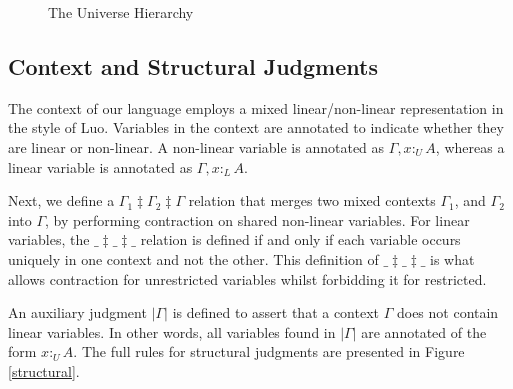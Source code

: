 \documentclass{article}
\theoremstyle{definition}
\newcommand{\pure}[1]{|#1|}
\newcommand{\utype}{:_{\scriptscriptstyle U}}
\newcommand{\ltype}{:_{\scriptscriptstyle L}}
\newcommand{\mrg}[3]{#1\ddagger#2\ddagger#3}
\begin{document}
  \begin{figure}[H]
    \caption{The Universe Hierarchy}
    \centering
    \label{universe}
  \end{figure}

  \subsection{Context and Structural Judgments}
  The context of our language employs a mixed linear/non-linear representation in the style of Luo\cite{luo}. Variables in the context are annotated to indicate whether they are linear or non-linear. A non-linear variable is annotated as $\Gamma, x \utype A$, whereas a linear variable is annotated as $\Gamma, x \ltype A$. 
  
  Next, we define a $\mrg{\Gamma_1}{\Gamma_2}{\Gamma}$ relation that merges two mixed contexts $\Gamma_1$, and $\Gamma_2$ into $\Gamma$, by performing contraction on shared non-linear variables. For linear variables, the $\mrg{\_}{\_}{\_}$ relation is defined if and only if each variable occurs uniquely in one context and not the other. This definition of $\mrg{\_}{\_}{\_}$ is what allows contraction for unrestricted variables whilst forbidding it for restricted.

  An auxiliary judgment $\pure{\Gamma}$ is defined to assert that a context $\Gamma$ does not contain linear variables. In other words, all variables found in $\pure{\Gamma}$ are annotated of the form $x \utype A$. The full rules for structural judgments are presented in Figure \ref{structural}.
  
\end{document}
